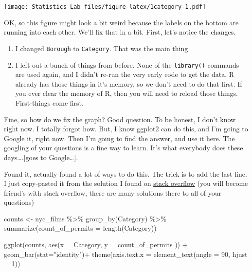 \documentclass[
]{book}
\newenvironment{Shaded}{\begin{snugshade}}{\end{snugshade}}
\newcommand{\AttributeTok}[1]{\textcolor[rgb]{0.77,0.63,0.00}{#1}}
\newcommand{\DecValTok}[1]{\textcolor[rgb]{0.00,0.00,0.81}{#1}}
\newcommand{\FunctionTok}[1]{\textcolor[rgb]{0.00,0.00,0.00}{#1}}
\newcommand{\NormalTok}[1]{#1}
\newcommand{\OtherTok}[1]{\textcolor[rgb]{0.56,0.35,0.01}{#1}}
\newcommand{\SpecialCharTok}[1]{\textcolor[rgb]{0.00,0.00,0.00}{#1}}
\newcommand{\StringTok}[1]{\textcolor[rgb]{0.31,0.60,0.02}{#1}}
\begin{document}
\texttt{[image: Statistics\_Lab\_files/figure-latex/1category-1.pdf]}

OK, so this figure might look a bit weird because the labels on the bottom are running into each other. We'll fix that in a bit. First, let's notice the changes.

\begin{enumerate}
\def\labelenumi{\arabic{enumi}.}
\item
  I changed \texttt{Borough} to \texttt{Category}. That was the main thing
\item
  I left out a bunch of things from before. None of the \texttt{library()} commands are used again, and I didn't re-run the very early code to get the data. R already has those things in it's memory, so we don't need to do that first. If you ever clear the memory of R, then you will need to reload those things. First-things come first.
\end{enumerate}

Fine, so how do we fix the graph? Good question. To be honest, I don't know right now. I totally forgot how. But, I know ggplot2 can do this, and I'm going to Google it, right now. Then I'm going to find the answer, and use it here. The googling of your questions is a fine way to learn. It's what everybody does these days\ldots.{[}goes to Google\ldots{]}.

Found it, actually found a lot of ways to do this. The trick is to add the last line. I just copy-pasted it from the solution I found on \href{https://stackoverflow.com/questions/1330989/rotating-and-spacing-axis-labels-in-ggplot2}{stack overflow} (you will become friend's with stack overflow, there are many solutions there to all of your questions)

\begin{Shaded}
\begin{Highlighting}[]
\NormalTok{counts }\OtherTok{\textless{}{-}}\NormalTok{ nyc\_films }\SpecialCharTok{\%\textgreater{}\%}
          \FunctionTok{group\_by}\NormalTok{(Category) }\SpecialCharTok{\%\textgreater{}\%}
          \FunctionTok{summarize}\NormalTok{(}\AttributeTok{count\_of\_permits =} \FunctionTok{length}\NormalTok{(Category))}

\FunctionTok{ggplot}\NormalTok{(counts, }\FunctionTok{aes}\NormalTok{(}\AttributeTok{x =}\NormalTok{ Category, }\AttributeTok{y =}\NormalTok{ count\_of\_permits )) }\SpecialCharTok{+}
  \FunctionTok{geom\_bar}\NormalTok{(}\AttributeTok{stat=}\StringTok{"identity"}\NormalTok{)}\SpecialCharTok{+} 
  \FunctionTok{theme}\NormalTok{(}\AttributeTok{axis.text.x =} \FunctionTok{element\_text}\NormalTok{(}\AttributeTok{angle =} \DecValTok{90}\NormalTok{, }\AttributeTok{hjust =} \DecValTok{1}\NormalTok{))}
\end{Highlighting}
\end{Shaded}
\end{document}

